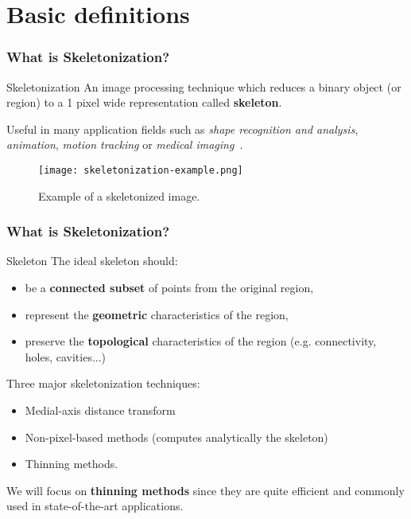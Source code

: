 \section{Basic definitions}
\begin{frame}
  \frametitle{What is Skeletonization?}
  \begin{block}{Skeletonization}
    An image processing technique which reduces a binary object (or region) to a 1 pixel wide representation called \textbf{skeleton}.
  \end{block}
  Useful in many application fields such as \emph{shape recognition and analysis}, \emph{animation}, \emph{motion tracking} or \emph{medical imaging}~\cite{skel-applications}.
  \begin{figure}
    \begin{center}
      \texttt{[image: skeletonization-example.png]}
      \caption{Example of a skeletonized image.}
    \end{center}
  \end{figure}
\end{frame}

\begin{frame}
  \label{sli:skeleton}
  \frametitle{What is Skeletonization?}
  \begin{block}{Skeleton}
    The ideal skeleton should:
    \begin{itemize}
      \item be a \textbf{connected subset} of points from the original region,
      \item represent the \textbf{geometric} characteristics of the region,
      \item preserve the \textbf{topological} characteristics of the region (e.g. connectivity, holes, cavities...)
    \end{itemize}
  \end{block}

  Three major skeletonization techniques:
  \begin{itemize}
    \item Medial-axis distance transform
    \item Non-pixel-based methods (computes analytically the skeleton)
    \item Thinning methods.
  \end{itemize}
  \vspace{0.5cm}
  We will focus on \textbf{thinning methods} since they are quite efficient and commonly used in state-of-the-art applications.
\end{frame}

